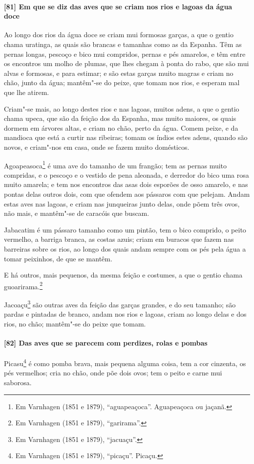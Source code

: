 \begin{linenumbers}
\paragraph{[81] Em que se diz das aves que se criam nos rios e lagoas da água doce}\quad
Ao longo dos rios da água doce se criam mui formosas garças, a que o gentio chama
uratinga, as quais são brancas e tamanhas como as da Espanha. Têm as pernas longas,
pescoço e bico mui compridos, pernas e pés amarelos, e têm entre os encontros um molho de
plumas, que lhes chegam à ponta do rabo, que são mui alvas e formosas, e para estimar; e
são estas garças muito magras e criam no chão, junto da água; mantêm"-se do peixe, que
tomam nos rios, e esperam mal que lhe atirem.

Criam"-se mais, ao longo destes rios e nas lagoas, muitos adens, a que o gentio chama
upeca, que são da feição dos da Espanha, mas muito maiores, os quais dormem em árvores
altas, e criam no chão, perto da água. Comem peixe, e da mandioca que está a curtir nas
ribeiras; tomam os índios estes adens, quando são novos, e criam"-nos em casa, onde se
fazem muito domésticos.

Agoapeasoca\footnote{ Em Varnhagen (1851 e 1879), ``aguapeaçoca''. Aguapeaçoca ou jaçanã.}
é uma ave do tamanho de um frangão; tem as pernas muito compridas, e o pescoço e o vestido
de pena aleonada, e derredor do bico uma rosa muito amarela; e tem nos encontros das asas
dois esporões de osso amarelo, e nas pontas delas outros dois, com que ofendem aos
pássaros com que pelejam. Andam estas aves nas lagoas, e criam nas junqueiras junto delas,
onde põem três ovos, não mais, e mantêm"-se de caracóis que buscam.

Jabacatim é um pássaro tamanho como um pintão, tem o bico comprido, o peito vermelho, a
barriga branca, as costas azuis; criam em buracos que fazem nas barreiras sobre os rios,
ao longo dos quais andam sempre com os pés pela água a tomar peixinhos, de que se mantêm.

E há outros, mais pequenos, da mesma feição e costumes, a que o gentio chama
guoarirama.\footnote{ Em Varnhagen (1851 e 1879), ``garirama''.}

Jacoaçu\footnote{ Em Varnhagen (1851 e 1879), ``jacuaçu''.} são outras aves da feição das
garças grandes, e do seu tamanho; são pardas e pintadas de branco, andam nos rios e
lagoas, criam ao longo delas e dos rios, no chão; mantêm"-se do peixe que tomam.

\paragraph{[82] Das aves que se parecem com perdizes, rolas e pombas}\quad
Picasu\footnote{ Em Varnhagen (1851 e 1879), ``picaçu''. Picaçu.} é como pomba brava, mais
pequena alguma coisa, tem a cor cinzenta, os pés vermelhos; cria no chão, onde põe dois
ovos; tem o peito e carne mui saborosa.


\end{linenumbers}
